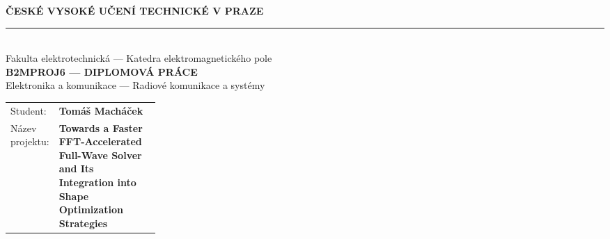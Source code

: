 \documentclass[11pt, a4paper]{article}
\newcommand{\kod}{B2MPROJ6}
\newcommand{\program}{Elektronika a komunikace --- Radiové komunikace a systémy}
\newcommand{\student}{Tomáš Macháček}
\begin{document}
\begin{center}
    {\Large\bfseries ČESKÉ VYSOKÉ UČENÍ TECHNICKÉ V PRAZE} \\[0.5ex]
    \rule{\linewidth}{0.4pt} \\[0.5ex]
    {\large Fakulta elektrotechnická --- Katedra elektromagnetického pole} \\[3ex]
    {\LARGE\bfseries \kod{} --- DIPLOMOVÁ PRÁCE} \\[1ex]
    {\large \program}
\end{center}

\vspace{2ex}

\begin{tabularx}{\linewidth}{@{} p{0.25\linewidth} X @{}}
    Student: & \textbf{\student} \\[2ex]
    Název projektu: & \raggedright\textbf{\foreignlanguage{english}{Towards a Faster FFT-Accelerated Full-Wave Solver and Its Integration into Shape Optimization Strategies}}
\end{tabularx}

\vspace{2ex}
\end{document}

